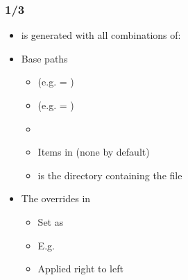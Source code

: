 \begin{frame}
  \frametitle{ 1/3}
  \begin{itemize}
    \item {} is generated with all combinations of:
    \item Base paths
      \begin{itemize}
        \item {}  (e.g.  = )
        \item {} (e.g.  = )
        \item {}
        \item Items in  (none by default)
        \item {} is the directory containing the  file
      \end{itemize}
    \item The overrides in 
      \begin{itemize}
        \item Set as 
        \item E.g. 
        \item Applied right to left
      \end{itemize}
  \end{itemize}
\end{frame}

